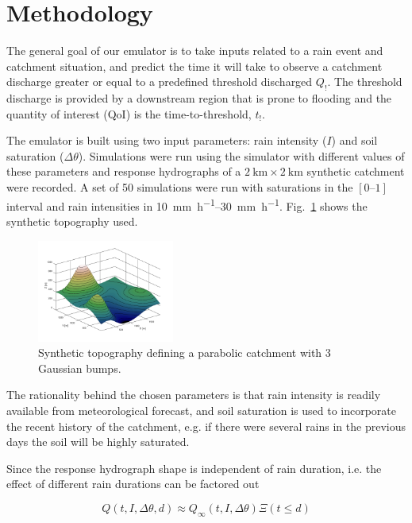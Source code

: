 \documentclass[12pt,a4paper,english,twocolumn,fleqn]{narms}
\begin{document}
\section{Methodology}

The general goal of our emulator is to take inputs related to a rain event and catchment situation, and predict the time it will take to observe a catchment discharge greater or equal to a predefined threshold discharged $Q_!$.
The threshold discharge is provided by a downstream region that is prone to flooding and the quantity of interest (QoI) is the time-to-threshold, $t_!$.

The emulator is built using two input parameters: rain intensity ($I$) and soil saturation ($\Delta\theta$).
Simulations were run using the simulator with different values of these parameters and response hydrographs of a $\SI{2}{\kilo\metre} \times \SI{2}{\kilo\metre}$ synthetic catchment were recorded.
A set of \num{50} simulations were run with saturations in the $[\numrange{0}{1}]$ interval
and rain intensities in \SIrange{10}{30}{\milli\metre\per\hour}.
Fig.~\ref{img:topography} shows the synthetic topography used.

\begin{figure}[htpb]
  \centering
  \includegraphics[width=0.4\textwidth]{img/topography.png}
  \caption{Synthetic topography defining a parabolic catchment with \num{3} Gaussian bumps.}
  \label{img:topography}
\end{figure}

The rationality behind the chosen parameters is that rain intensity is readily available from meteorological forecast, and soil saturation is used to incorporate the recent history of the catchment, e.g. if there were several rains in the previous days the soil will be highly saturated.

Since the response hydrograph shape is independent of rain duration, i.e. the effect of different rain durations can be factored out

\begin{equation}
Q(t, I, \Delta\theta, d) \approx Q_\infty(t, I, \Delta\theta) \Xi(t \leq d)
\end{equation}
\end{document}
